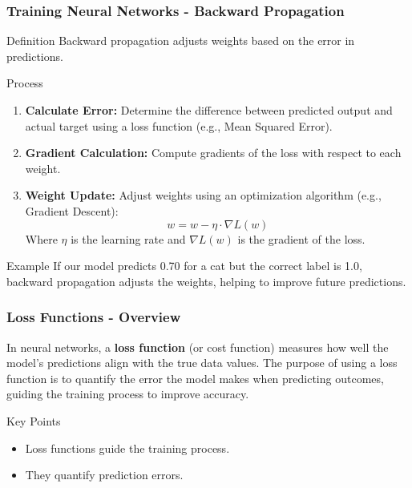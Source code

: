 \documentclass[aspectratio=169]{beamer}
\begin{document}
\begin{frame}[fragile]
    \frametitle{Training Neural Networks - Backward Propagation}
    \begin{block}{Definition}
        Backward propagation adjusts weights based on the error in predictions.
    \end{block}

    \begin{block}{Process}
        \begin{enumerate}
            \item \textbf{Calculate Error:} Determine the difference between predicted output and actual target using a loss function (e.g., Mean Squared Error).
            \item \textbf{Gradient Calculation:} Compute gradients of the loss with respect to each weight.
            \item \textbf{Weight Update:} Adjust weights using an optimization algorithm (e.g., Gradient Descent):
            \begin{equation}
                w = w - \eta \cdot \nabla L(w)
            \end{equation}
            Where \( \eta \) is the learning rate and \( \nabla L(w) \) is the gradient of the loss.
        \end{enumerate}
    \end{block}

    \begin{block}{Example}
        If our model predicts 0.70 for a cat but the correct label is 1.0, backward propagation adjusts the weights, helping to improve future predictions.
    \end{block}
\end{frame}

\begin{frame}[fragile]
    \frametitle{Loss Functions - Overview}
    In neural networks, a \textbf{loss function} (or cost function) measures how well the model's predictions align with the true data values. The purpose of using a loss function is to quantify the error the model makes when predicting outcomes, guiding the training process to improve accuracy.

    \begin{block}{Key Points}
        \begin{itemize}
            \item Loss functions guide the training process.
            \item They quantify prediction errors.
        \end{itemize}
    \end{block}
\end{frame}
\end{document}
